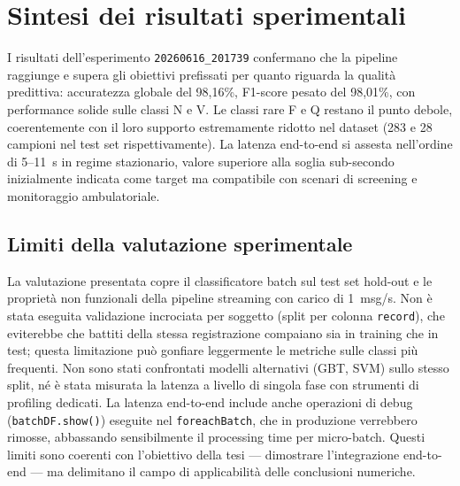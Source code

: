 \section{Sintesi dei risultati sperimentali}

I risultati dell'esperimento \texttt{20260616\_201739} confermano che la pipeline raggiunge e supera gli obiettivi prefissati per quanto riguarda la qualità predittiva:
accuratezza globale del 98,16\%, F1-score pesato del 98,01\%, con performance solide sulle classi N e V.
Le classi rare F e Q restano il punto debole, coerentemente con il loro supporto estremamente ridotto nel dataset (283 e 28 campioni nel test set rispettivamente).
La latenza end-to-end si assesta nell'ordine di 5--11~s in regime stazionario, valore superiore alla soglia sub-secondo inizialmente indicata come target ma compatibile con scenari di screening e monitoraggio ambulatoriale.

\subsection{Limiti della valutazione sperimentale}

La valutazione presentata copre il classificatore batch sul test set hold-out e le proprietà non funzionali della pipeline streaming con carico di 1~msg/s.
Non è stata eseguita validazione incrociata per soggetto (split per colonna \texttt{record}), che eviterebbe che battiti della stessa registrazione compaiano sia in training che in test; questa limitazione può gonfiare leggermente le metriche sulle classi più frequenti.
Non sono stati confrontati modelli alternativi (GBT, SVM) sullo stesso split, né è stata misurata la latenza a livello di singola fase con strumenti di profiling dedicati.
La latenza end-to-end include anche operazioni di debug (\texttt{batchDF.show()}) eseguite nel \texttt{foreachBatch}, che in produzione verrebbero rimosse, abbassando sensibilmente il processing time per micro-batch.
Questi limiti sono coerenti con l'obiettivo della tesi --- dimostrare l'integrazione end-to-end --- ma delimitano il campo di applicabilità delle conclusioni numeriche.
